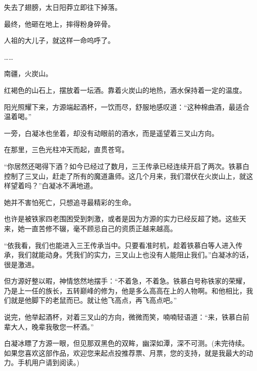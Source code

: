 \begin{this_body}
失去了翅膀，太日阳莽立即往下掉落。

最终，他砸在地上，摔得粉身碎骨。

人祖的大儿子，就这样一命呜呼了。

……

南疆，火炭山。

红褐色的山石上，摆放着一坛酒。靠着火炭山的地热，酒水保持着一定的温度。

阳光照耀下来，方源端起酒杯，一饮而尽，舒服地感叹道：“这种棉曲酒，最适合温着喝。”

一旁，白凝冰也坐着，却没有动眼前的酒水，而是遥望着三叉山方向。

在那里，三色光柱冲天而起，直贯苍穹。

“你居然还喝得下酒？如今已经过了数月，三王传承已经连续开启了两次。铁慕白控制了三叉山，赶走了所有的魔道蛊师。这几个月来，我们潜伏在火炭山上，就这样望着吗？”白凝冰不满地道。

她并不害怕死亡，只想追寻最精彩的生命。

也许是被铁家四老围困受到刺激，或者是因为方源的实力已经反超了她。这些天来，她一直苦修不辍，毫不顾忌自己的资质正越来越高。

“依我看，我们也能进入三王传承当中。只要看准时机，趁着铁慕白等人进入传承，我们就能动身。凭我们的实力，三叉山上也没有人能阻止我们。”白凝冰的话，很是激进。

但方源好整以暇，神情悠然地摆手：“不着急，不着急。铁慕白号称铁家的荣耀，乃是上一任的族长，五转巅峰的修为，他是多么高高在上的人物啊。和他相比，我们就是他脚下的老鼠而已。就让他飞高点，再飞高点吧。”

说完，他举起酒杯，对着三叉山的方向，微微而笑，喃喃轻语道：“来，铁慕白前辈大人，晚辈我敬您一杯酒。”

白凝冰瞟了方源一眼，但见那双黑色的双眸，幽深如潭，深不可测。(未完待续。如果您喜欢这部作品，欢迎您来起点投推荐票、月票，您的支持，就是我最大的动力。手机用户请到阅读。)

\end{this_body}

